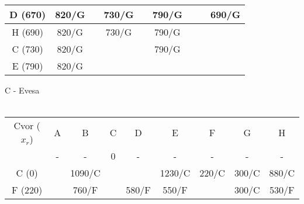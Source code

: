 \documentclass[12pt]{article}
\begin{document}
\begin{enumerate}
\begin{tabular}{|c|c|c|c|c|c|c|c|c|}
D (670)      & 820/G                        &                          & {\color[HTML]{000000} 730/G} & {\color[HTML]{000000} }      & 790/G                         & {\color[HTML]{FE0000} }      &                              & {\color[HTML]{FE0000} 690/G} \\ \hline
H (690)      & 820/G                        &                          & {\color[HTML]{FE0000} 730/G} & {\color[HTML]{FE0000} }      & 790/G                         &                              &                              &                              \\ \hline
C (730)      & 820/G                        &                          & {\color[HTML]{FE0000} }      & {\color[HTML]{FE0000} }      & {\color[HTML]{FE0000} 790/G}  &                              &                              &                              \\ \hline
E (790)      & {\color[HTML]{FE0000} 820/G} & {\color[HTML]{FE0000} }  &                              &                              &                               &                              &                              &                              \\ \hline
\end{tabular}
\newpage
C - Evesa
\\
\\
\begin{tabular}{|c|c|c|c|c|c|c|c|c|}
\hline
Cvor ($x_r$) & A                            & B                            & C                        & D                            & E                             & F                            & G                            & H                            \\ \cline{2-9} 
             & {\color[HTML]{000000} -}     & {\color[HTML]{333333} -}     & {\color[HTML]{FE0000} 0} & -                            & -                             & -                            & -                            & -                            \\ \hline
C (0)        &                              & 1090/C                       &                          &                              & {\color[HTML]{333333} 1230/C} & {\color[HTML]{FE0000} 220/C} & {\color[HTML]{333333} 300/C} & 880/C                        \\ \hline
F (220)      &                              & 760/F                        &                          & 580/F                        & 550/F                         & {\color[HTML]{FE0000} }      & {\color[HTML]{FE0000} 300/C} & {\color[HTML]{333333} 530/F} \\ \hline

\end{tabular}
\end{enumerate}
\end{document}
